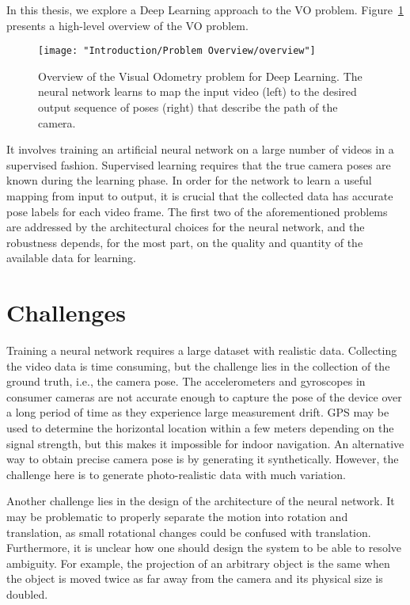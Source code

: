 		In this thesis, we explore a Deep Learning approach to the VO problem.
		Figure~\ref{fig:overview-visual-odometry} presents a high-level overview of the VO problem.
		\begin{figure}[t]
			\centering
			\texttt{[image: "Introduction/Problem Overview/overview"]}
			\caption[Description of the Visual Odometry problem]
					{Overview of the Visual Odometry problem for Deep Learning.
					 The neural network learns to map the input video (left) to the desired output sequence of poses (right) that describe the path of the camera.
					 \label{fig:overview-visual-odometry}}
		\end{figure}
		It involves training an artificial neural network on a large number of videos in a supervised fashion.
		Supervised learning requires that the true camera poses are known during the learning phase.
		In order for the network to learn a useful mapping from input to output, it is crucial that the collected data has accurate pose labels for each video frame.
		The first two of the aforementioned problems are addressed by the architectural choices for the neural network, and the robustness depends, for the most part, on the quality and quantity of the available data for learning.
		
		
	\section{Challenges}
		
		Training a neural network requires a large dataset with realistic data.
		Collecting the video data is time consuming, but the challenge lies in the collection of the ground truth, i.e., the camera pose.
		The accelerometers and gyroscopes in consumer cameras are not accurate enough to capture the pose of the device over a long period of time as they experience large measurement drift.
		GPS may be used to determine the horizontal location within a few meters depending on the signal strength, but this makes it impossible for indoor navigation.
		An alternative way to obtain precise camera pose is by generating it synthetically.
		However, the challenge here is to generate photo-realistic data with much variation.
		
		Another challenge lies in the design of the architecture of the neural network.
		It may be problematic to properly separate the motion into rotation and translation, as small rotational changes could be confused with translation.
		Furthermore, it is unclear how one should design the system to be able to resolve ambiguity.
		For example, the projection of an arbitrary object is the same when the object is moved twice as far away from the camera and its physical size is doubled.
		
